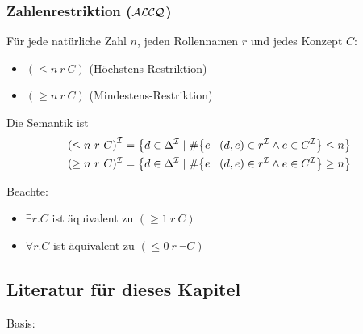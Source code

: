 \subsubsection{Zahlenrestriktion (\texorpdfstring{$\mathcal{A}\mathcal{L}\mathcal{C}\mathcal{Q}$}{ALCQ})}\label{zahlenrestriktion-alcq}

\begin{definition}[Zahlenrestriktion]
Für jede natürliche Zahl $n$, jeden Rollennamen $r$ und
jedes Konzept $C$:

\begin{itemize}
  \item $\left( \leq n\ r\ C \right)$ (Höchstens-Restriktion)
  \item $\left( \geq n\ r\ C \right)$ (Mindestens-Restriktion)
\end{itemize}

Die Semantik ist \begin{align*}
    \left( \leq n\ r\ C \right)^\MI &= \left\{ d \in \Delta^\MI \mid \#\left\{ e\mid \left( d,e \right) \in r^\MI \land e \in C^\MI \right\} \leq n \right\}\\
    ( \geq n\ r\ C)^\MI &= \left\{ d \in \Delta^\MI \mid \#\left\{ e\mid \left( d,e \right) \in r^\MI \land e \in C^\MI \right\} \geq n \right\}
\end{align*}
\end{definition}

\begin{tafel}[TODO]
\end{tafel}

Beachte:

\begin{itemize}
  \item $\exists r.C$ ist äquivalent zu $(\geq 1\ r\ C)$
  \item $\forall r.C$ ist äquivalent zu $(\leq 0\ r\ \neg C)$
\end{itemize}

\subsection*{Literatur für dieses Kapitel}

Basis:

